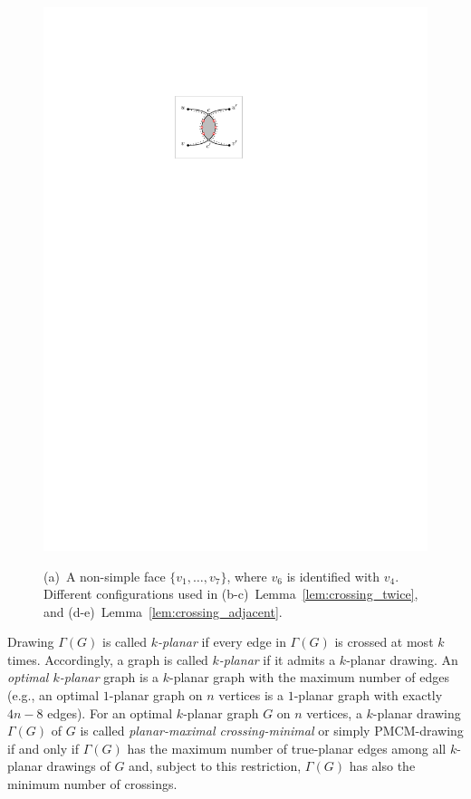 \begin{figure}[tb]
\begin{minipage}[b]{.18\textwidth}
        \includegraphics[width=\textwidth,page=4]{images/crossing_conf}
        \subcaption{~}\label{fig:crossing_adjacent_2}
    \end{minipage}	
    \caption{%
    (a)~A non-simple face $\{v_1,\ldots,v_7\}$, where $v_6$ is identified with $v_4$.
    Different configurations used in 
    (b-c)~Lemma~\ref{lem:crossing_twice}, and 
    (d-e)~Lemma~\ref{lem:crossing_adjacent}.}
    \label{fig:2_planar_polygon_conf}
\end{figure} 

Drawing $\Gamma(G)$ is called \emph{$k$-planar} if every edge in $\Gamma(G)$ is crossed at most $k$ times. Accordingly, a graph is called \emph{$k$-planar} if it admits a $k$-planar drawing. An \emph{optimal $k$-planar} graph is a $k$-planar graph with the maximum number of edges (e.g., an optimal $1$-planar graph on $n$ vertices is a $1$-planar graph with exactly $4n-8$ edges). For an optimal $k$-planar graph $G$ on $n$ vertices, a $k$-planar drawing $\Gamma(G)$ of $G$ is called \emph{planar-maximal crossing-minimal} or simply PMCM-drawing if and only if $\Gamma(G)$ has the maximum number of true-planar edges among all $k$-planar drawings of $G$ and, subject to this restriction, $\Gamma(G)$ has also the minimum number of crossings.

